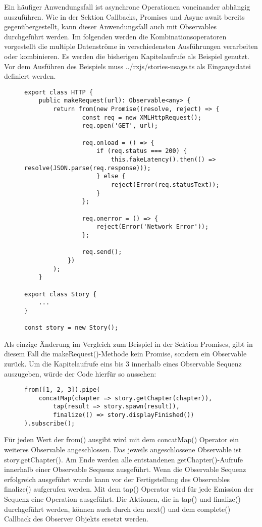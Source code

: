 \noindent
Ein häufiger Anwendungsfall ist asynchrone Operationen voneinander abhängig auszuführen. Wie in der Sektion Callbacks, Promises und Async await bereits gegenübergestellt, kann dieser Anwendungsfall auch mit Observables durchgeführt werden. Im folgenden werden die Kombinationsoperatoren vorgestellt die multiple Datenströme in verschiedensten Ausführungen verarbeiten oder kombinieren. Es werden die bisherigen Kapitelaufrufe als Beispiel genutzt. Vor dem Ausführen des Beispiels muss ../rxjs/stories-usage.ts als Eingangsdatei definiert werden.

\begin{figure}[H]
\begin{lstlisting}[basicstyle=\small]
export class HTTP {
    public makeRequest(url): Observable<any> {
        return from(new Promise((resolve, reject) => {
                const req = new XMLHttpRequest();
                req.open('GET', url);

                req.onload = () => {
                    if (req.status === 200) {
                        this.fakeLatency().then(() => resolve(JSON.parse(req.response)));
                    } else {
                        reject(Error(req.statusText));
                    }
                };

                req.onerror = () => {
                    reject(Error('Network Error'));
                };

                req.send();
            })
        );
    }

export class Story {
    ...
}

const story = new Story();
\end{lstlisting}
\end{figure}

\noindent
Als einzige Änderung im Vergleich zum Beispiel in der Sektion Promises, gibt in diesem Fall die makeRequest()-Methode kein Promise, sondern ein Observable zurück. Um die Kapitelaufrufe eins bis 3 innerhalb eines Observable Sequenz auszugeben, würde der Code hierfür so aussehen:
\begin{figure}[H]
\begin{lstlisting}[basicstyle=\small]
from([1, 2, 3]).pipe(
    concatMap(chapter => story.getChapter(chapter)),
        tap(result => story.spawn(result)),
        finalize(() => story.displayFinished())
).subscribe();
\end{lstlisting}
\end{figure}

\noindent
Für jeden Wert der from() ausgibt wird mit dem concatMap() Operator ein weiteres Observable angeschlossen. Das jeweils angeschlossene Observable ist story.getChapter(). Am Ende werden alle entstandenen getChapter()-Aufrufe innerhalb einer Observable Sequenz ausgeführt. Wenn die Observable Sequenz erfolgreich ausgeführt wurde kann vor der Fertigstellung des Observables finalize() aufgerufen werden. Mit dem tap() Operator wird für jede Emission der Sequenz eine Operation ausgeführt. Die Aktionen, die in tap() und finalize() durchgeführt werden, können auch durch den next() und dem complete() Callback des Observer Objekts ersetzt werden.\\

